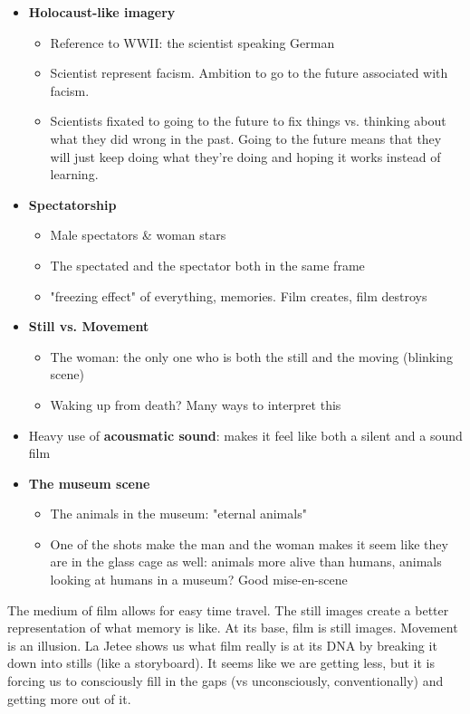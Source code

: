 \documentclass[11pt,fleqn]{book} %
\begin{document}
\begin{itemize}
\begin{itemize}
    \end{itemize}
    \item \textbf{Holocaust-like imagery}
    \begin{itemize}
        \item Reference to WWII: the scientist speaking German
        \item Scientist represent facism. Ambition to go to the future associated with facism. 
        \item Scientists fixated to going to the future to fix things vs. thinking about what they did wrong in the past. Going to the future means that they will just keep doing what they're doing and hoping it works instead of learning.
    \end{itemize}
    \item \textbf{Spectatorship}
    \begin{itemize}
        \item Male spectators \& woman stars
        \item The spectated and the spectator both in the same frame
        \item "freezing effect" of everything, memories. Film creates, film destroys
    \end{itemize}
    \item \textbf{Still vs. Movement}
    \begin{itemize}
        \item The woman: the only one who is both the still and the moving (blinking scene)
        \item Waking up from death? Many ways to interpret this
    \end{itemize}
    \item Heavy use of \textbf{acousmatic sound}: makes it feel like both a silent and a sound film
    \item \textbf{The museum scene}
    \begin{itemize}
        \item The animals in the museum: "eternal animals"
        \item One of the shots make the man and the woman makes it seem like they are in the glass cage as well: animals more alive than humans, animals looking at humans in a museum? Good mise-en-scene
    \end{itemize}
\end{itemize}
\begin{remark}
    The medium of film allows for easy time travel. The still images create a better representation of what memory is like. At its base, film is still images. Movement is an illusion. La Jetee shows us what film really is at its DNA by breaking it down into stills (like a storyboard). It seems like we are getting less, but it is forcing us to consciously fill in the gaps (vs unconsciously, conventionally) and getting more out of it. 
\end{remark}
\end{document}
